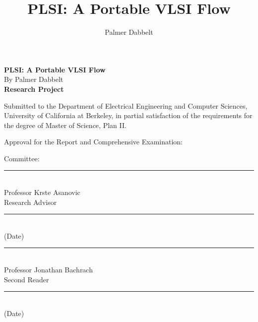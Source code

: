 \documentclass[masters2]{ucbthesis}
\author{Palmer Dabbelt}
\title{PLSI: A Portable VLSI Flow}
\begin{document}
\thispagestyle{empty}
\large
\begin{center}
\textbf{PLSI: A Portable VLSI Flow}\\
By Palmer Dabbelt\\
\textbf{Research Project}\\
\end{center}

\normalsize
Submitted to the Department of Electrical Engineering and Computer Sciences,
University of California at Berkeley, in partial satisfaction of the
requirements for the degree of Master of Science, Plan II.

Approval for the Report and Comprehensive Examination:

\begin{center}
Committee:\\
\vspace{0.5in}\rule{5in}{1pt}\\
Professor Krste Asanovic\\
Research Advisor\\
\vspace{0.5in}\rule{5in}{1pt}\\
(Date)\\
\vspace{0.5in}\rule{5in}{1pt}\\
Professor Jonathan Bachrach\\
Second Reader\\
\vspace{0.5in}\rule{5in}{1pt}\\
(Date)\\
\end{center}

\copyrightpage
\end{document}
